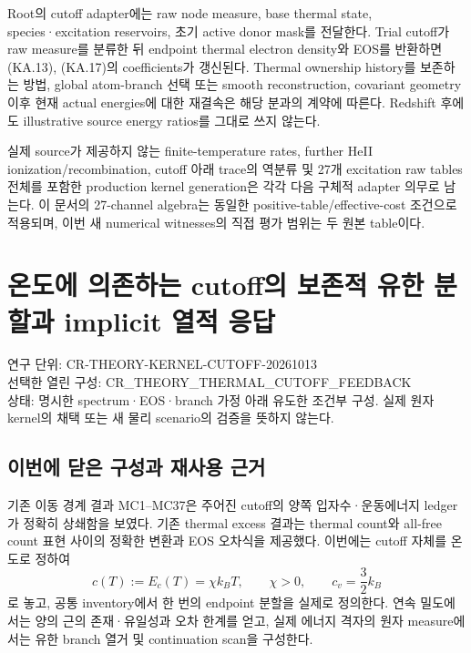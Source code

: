 Root의 cutoff adapter에는 raw node measure, base thermal state, species·excitation reservoirs, 초기 active donor mask를 전달한다. Trial cutoff가 raw measure를 분류한 뒤 endpoint thermal electron density와 EOS를 반환하면 (KA.13), (KA.17)의 coefficients가 갱신된다. Thermal ownership history를 보존하는 방법, global atom-branch 선택 또는 smooth reconstruction, covariant geometry 이후 현재 actual energies에 대한 재결속은 해당 분과의 계약에 따른다. Redshift 후에도 illustrative source energy ratios를 그대로 쓰지 않는다.

실제 source가 제공하지 않는 finite-temperature rates, further HeII ionization/recombination, cutoff 아래 trace의 역분류 및 27개 excitation raw tables 전체를 포함한 production kernel generation은 각각 다음 구체적 adapter 의무로 남는다. 이 문서의 27-channel algebra는 동일한 positive-table/effective-cost 조건으로 적용되며, 이번 새 numerical witnesses의 직접 평가 범위는 두 원본 table이다.

\hypertarget{uxc628uxb3c4uxc5d0-uxc758uxc874uxd558uxb294-cutoffuxc758-uxbcf4uxc874uxc801-uxc720uxd55c-uxbd84uxd560uxacfc-implicit-uxc5f4uxc801-uxc751uxb2f5}{%
\section{온도에 의존하는 cutoff의 보존적 유한 분할과 implicit 열적 응답}\label{uxc628uxb3c4uxc5d0-uxc758uxc874uxd558uxb294-cutoffuxc758-uxbcf4uxc874uxc801-uxc720uxd55c-uxbd84uxd560uxacfc-implicit-uxc5f4uxc801-uxc751uxb2f5}}

연구 단위: CR-THEORY-KERNEL-CUTOFF-20261013\\
선택한 열린 구성: CR\_THEORY\_THERMAL\_CUTOFF\_FEEDBACK\\
상태: 명시한 spectrum·EOS·branch 가정 아래 유도한 조건부 구성. 실제 원자 kernel의 채택 또는 새 물리 scenario의 검증을 뜻하지 않는다.

\hypertarget{uxc774uxbc88uxc5d0-uxb2ebuxc740-uxad6cuxc131uxacfc-uxc7acuxc0acuxc6a9-uxadfcuxac70}{%
\subsection{이번에 닫은 구성과 재사용 근거}\label{uxc774uxbc88uxc5d0-uxb2ebuxc740-uxad6cuxc131uxacfc-uxc7acuxc0acuxc6a9-uxadfcuxac70}}

기존 이동 경계 결과 MC1--MC37은 주어진 cutoff의 양쪽 입자수·운동에너지 ledger가 정확히 상쇄함을 보였다. 기존 thermal excess 결과는 thermal count와 all-free count 표현 사이의 정확한 변환과 EOS 오차식을 제공했다. 이번에는 cutoff 자체를 온도로 정하여 \[
c(T):=E_c(T)=\chi k_BT,\qquad \chi>0,\qquad c_v=\frac32k_B
\tag{TCF.1}
\] 로 놓고, 공통 inventory에서 한 번의 endpoint 분할을 실제로 정의한다. 연속 밀도에서는 양의 근의 존재·유일성과 오차 한계를 얻고, 실제 에너지 격자의 원자 measure에서는 유한 branch 열거 및 continuation scan을 구성한다.

